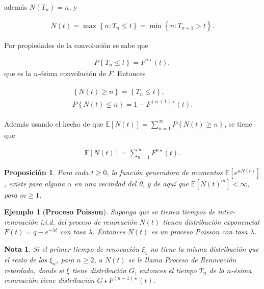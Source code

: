\documentclass{article}
\newtheorem{Ejem}{Ejemplo}[section]
\newtheorem{Note}{Nota}[section]
\newtheorem{Prop}{Proposición}[section]
\newcommand{\esp}{\mathbb{E}}
\numberwithin{equation}{section}
\begin{document}
adem\'as $N\left(T_{n}\right)=n$, y 

\begin{eqnarray}
N\left(t\right)=\max\left\{n:T_{n}\leq t\right\}=\min\left\{n:T_{n+1}>t\right\}.
\end{eqnarray}

Por propiedades de la convoluci\'on se sabe que

\begin{eqnarray}
P\left\{T_{n}\leq t\right\}=F^{n\star}\left(t\right),
\end{eqnarray}
que es la $n$-\'esima convoluci\'on de $F$. Entonces 

\begin{eqnarray}
\begin{array}{l}
\left\{N\left(t\right)\geq n\right\}=\left\{T_{n}\leq t\right\},\\
P\left\{N\left(t\right)\leq n\right\}=1-F^{\left(n+1\right)\star}\left(t\right).
\end{array}
\end{eqnarray}

Adem\'as usando el hecho de que $\esp\left[N\left(t\right)\right]=\sum_{n=1}^{\infty}P\left\{N\left(t\right)\geq n\right\}$, se tiene que

\begin{eqnarray}
\esp\left[N\left(t\right)\right]=\sum_{n=1}^{\infty}F^{n\star}\left(t\right).
\end{eqnarray}

\begin{Prop}
Para cada $t\geq0$, la funci\'on generadora de momentos $\esp\left[e^{\alpha N\left(t\right)}\right]$, existe para alguna $\alpha$ en una vecindad del 0, y de aqu\'i que $\esp\left[N\left(t\right)^{m}\right]<\infty$, para $m\geq1$.
\end{Prop}

\begin{Ejem}[\textbf{Proceso Poisson}]
Suponga que se tienen tiempos de inter-renovaci\'on \textit{i.i.d.} del proceso de renovaci\'on $N\left(t\right)$ tienen distribuci\'on exponencial $F\left(t\right)=q-e^{-\lambda t}$ con tasa $\lambda$. Entonces $N\left(t\right)$ es un proceso Poisson con tasa $\lambda$.

\end{Ejem}



\begin{Note}
Si el primer tiempo de renovaci\'on $\xi_{1}$ no tiene la misma distribuci\'on que el resto de las $\xi_{n}$, para $n\geq2$, a $N\left(t\right)$ se le llama Proceso de Renovaci\'on retardado, donde si $\xi$ tiene distribuci\'on $G$, entonces el tiempo $T_{n}$ de la $n$-\'esima renovaci\'on tiene distribuci\'on $G\star F^{\left(n-1\right)\star}\left(t\right)$.
\end{Note}
\end{document}
